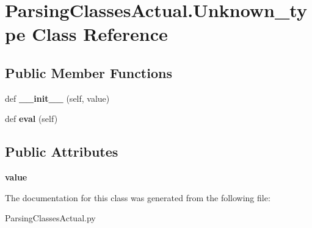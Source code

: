 \hypertarget{class_parsing_classes_actual_1_1_unknown__type}{}\section{Parsing\+Classes\+Actual.\+Unknown\+\_\+type Class Reference}
\label{class_parsing_classes_actual_1_1_unknown__type}
\subsection*{Public Member Functions}
\begin{DoxyCompactItemize}
\item 
def {\bfseries \+\_\+\+\_\+init\+\_\+\+\_\+} (self, value)\hypertarget{class_parsing_classes_actual_1_1_unknown__type_ab7bc9b4c235952c48078cba856dcc317}{}\label{class_parsing_classes_actual_1_1_unknown__type_ab7bc9b4c235952c48078cba856dcc317}

\item 
def {\bfseries eval} (self)\hypertarget{class_parsing_classes_actual_1_1_unknown__type_a7273966f0982773d6904a4318854c787}{}\label{class_parsing_classes_actual_1_1_unknown__type_a7273966f0982773d6904a4318854c787}

\end{DoxyCompactItemize}
\subsection*{Public Attributes}
\begin{DoxyCompactItemize}
\item 
{\bfseries value}\hypertarget{class_parsing_classes_actual_1_1_unknown__type_ade1dc926e512e4485d163e92b6df182d}{}\label{class_parsing_classes_actual_1_1_unknown__type_ade1dc926e512e4485d163e92b6df182d}

\end{DoxyCompactItemize}


The documentation for this class was generated from the following file\+:\begin{DoxyCompactItemize}
\item 
Parsing\+Classes\+Actual.\+py\end{DoxyCompactItemize}
